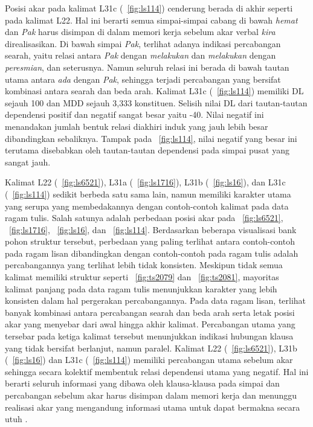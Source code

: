 Posisi akar pada kalimat L31c (\pic~\ref{fig:ls114}) cenderung berada di akhir seperti pada kalimat L22. Hal ini berarti semua simpai-simpai cabang di bawah \textit{hemat} dan \textit{Pak} harus disimpan di dalam memori kerja sebelum akar verbal \textit{kira} direalisasikan. Di bawah simpai \textit{Pak}, terlihat adanya indikasi percabangan searah, yaitu relasi antara \textit{Pak} dengan \textit{melakukan} dan \textit{melakukan} dengan \textit{peresmian}, dan seterusnya. Namun seluruh relasi ini berada di bawah tautan utama antara \textit{ada} dengan \textit{Pak}, sehingga terjadi percabangan yang bersifat kombinasi antara searah dan beda arah. Kalimat L31c (\pic~\ref{fig:ls114}) memiliki DL sejauh 100 dan MDD sejauh 3,333 konstituen. Selisih nilai DL dari tautan-tautan dependensi positif dan negatif sangat besar yaitu -40. Nilai negatif ini menandakan jumlah bentuk relasi diakhiri induk yang jauh lebih besar dibandingkan sebaliknya. Tampak pada \pic~\ref{fig:ls114}, nilai negatif yang besar ini terutama disebabkan oleh tautan-tautan dependensi pada simpai pusat yang sangat jauh.

Kalimat L22 (\pic~\ref{fig:ls6521}), L31a (\pic~\ref{fig:ls1716}), L31b (\pic~\ref{fig:ls16}), dan L31c (\pic~\ref{fig:ls114}) sedikit berbeda satu sama lain, namun memiliki karakter utama yang serupa yang membedakannya dengan contoh-contoh kalimat pada data ragam tulis. Salah satunya adalah perbedaan posisi akar pada \pic~\ref{fig:ls6521}, \pic~\ref{fig:ls1716}, \pic~\ref{fig:ls16}, dan \pic~\ref{fig:ls114}. Berdasarkan beberapa visualisasi bank pohon struktur tersebut, perbedaan yang paling terlihat antara contoh-contoh pada ragam lisan dibandingkan dengan contoh-contoh pada ragam tulis adalah percabangannya yang terlihat lebih tidak konsisten. Meskipun tidak semua kalimat memiliki struktur seperti \pic~\ref{fig:ts2079} dan \pic~\ref{fig:ts2081}, mayoritas kalimat panjang pada data ragam tulis menunjukkan karakter yang lebih konsisten dalam hal pergerakan percabangannya. Pada data ragam lisan, terlihat banyak kombinasi antara percabangan searah dan beda arah serta letak posisi akar yang menyebar dari awal hingga akhir kalimat. Percabangan utama yang tersebar pada ketiga kalimat tersebut menunjukkan indikasi hubungan klausa yang tidak bersifat berlanjut, namun paralel. Kalimat L22 (\pic~\ref{fig:ls6521}), L31b (\pic~\ref{fig:ls16}) dan L31c (\pic~\ref{fig:ls114}) memiliki percabangan utama sebelum akar sehingga secara kolektif membentuk relasi dependensi utama yang negatif. Hal ini berarti seluruh informasi yang dibawa oleh klausa-klausa pada simpai dan percabangan sebelum akar harus disimpan dalam memori kerja dan menunggu realisasi akar yang mengandung informasi utama untuk dapat bermakna secara utuh \citep{hawkins2014cross}.

